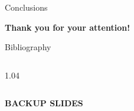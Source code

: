 \documentclass{beamer}
\begin{document}
\begin{frame}{Conclusions}
\end{frame}



\begin{frame} %
    \begin{center}
            \LARGE{\textbf{Thank you for your attention!}}
    \end{center}
\end{frame}
\begin{frame}{Bibliography} %
\begin{columns}
    \begin{column}{1.04\framewidth}
            \setlength{\leftmargini}{1.05em}
    
   {\footnotesize }
    \end{column}
\end{columns}

\end{frame}
\begin{frame} %
    \begin{center}
            \LARGE{\textbf{BACKUP SLIDES}}
    \end{center}
\end{frame}
\end{document}

